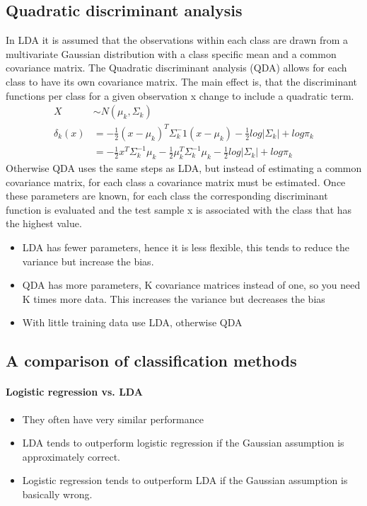 \documentclass[../document.tex]{subfiles}
\begin{document}
	\subsection{Quadratic discriminant analysis}
	In LDA it is assumed that the observations within each class are drawn from a multivariate Gaussian distribution with a class specific mean and a common covariance matrix. The Quadratic discriminant analysis (QDA) allows for each class to have its own covariance matrix. The main effect is, that the discriminant functions per class for a given observation x change to include a quadratic term.
	\begin{equation}
	\begin{split}
		X&\sim N(\mu_{k},\Sigma_{k})\\
		\delta_{k}(x)&=-\frac{1}{2}(x-\mu_{k})^T\Sigma_{k}^-1(x-\mu_{k})-\frac{1}{2}log|\Sigma_{k}|+log\pi_{k}\\
		&=-\frac{1}{2}x^T\Sigma_{k}^{-1}\mu_{k}-\frac{1}{2}\mu_{k}^T\Sigma_{k}^{-1}\mu_{k}-\frac{1}{2}log|\Sigma_{k}|+log\pi_{k}
	\end{split}
	\end{equation}
	Otherwise QDA uses the same steps as LDA, but instead of estimating a common covariance matrix, for each class a covariance matrix must be estimated. Once these parameters are known, for each class the corresponding discriminant function is evaluated and the test sample x is associated with the class that has the highest value.\\
	\begin{itemize}
		\item LDA has fewer parameters, hence it is less flexible, this tends to reduce the variance but increase the bias.
		\item QDA has more parameters, K covariance matrices instead of one, so you need K times more data. This increases the variance but decreases the bias
		\item With little training data use LDA, otherwise QDA
	\end{itemize}

	\subsection{A comparison of classification methods}

	\paragraph{Logistic regression vs. LDA}
	\begin{itemize}
		\item They often have very similar performance
		\item LDA tends to outperform logistic regression if the Gaussian assumption is approximately correct.
		\item Logistic regression tends to outperform LDA if the Gaussian assumption is basically wrong.
	\end{itemize}
\end{document}
